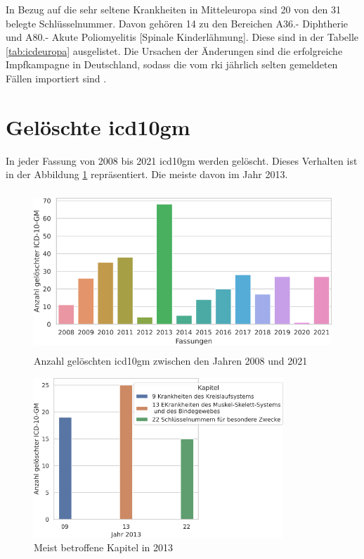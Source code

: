 In Bezug auf die sehr seltene Krankheiten in Mitteleuropa sind \textsf{20} von den \textsf{31} belegte Schlüsselnummer. Davon gehören \textsf{14} zu den Bereichen \textsf{A36.-} \textsf{Diphtherie} und \textsf{A80.-} \textsf{Akute Poliomyelitis [Spinale Kinderlähmung]}. Diese sind in der Tabelle \ref{tab:icdeuropa} ausgelistet. Die Ursachen der Änderungen sind die erfolgreiche Impfkampagne in Deutschland, sodass die vom \ac{rki} jährlich selten gemeldeten Fällen importiert sind \cite{dippol1}.

\section{Gelöschte \acs{icd10gm}}

In jeder Fassung von 2008 bis 2021 \ac{icd10gm} werden gelöscht. Dieses Verhalten ist in der Abbildung \ref{fig:newdeleteoldicdyear} repräsentiert. Die meiste davon im Jahr 2013. 

\clearpage

\begin{figure}[ht]
	\centering
	\includegraphics[height=6cm]{figures/neuVersionDelete}
	\caption[Gelöschte \acs{icd10gm} pro Jahr]{Anzahl gelöschten \acs{icd10gm} zwischen den Jahren 2008 und 2021}
	\label{fig:newdeleteoldicdyear}
\end{figure} 


\begin{figure}[ht]
	\centering
	\includegraphics[height=6cm]{figures/kaptnr13}
	\caption{Meist betroffene Kapitel in 2013}
	\label{fig:kap13}
\end{figure}

